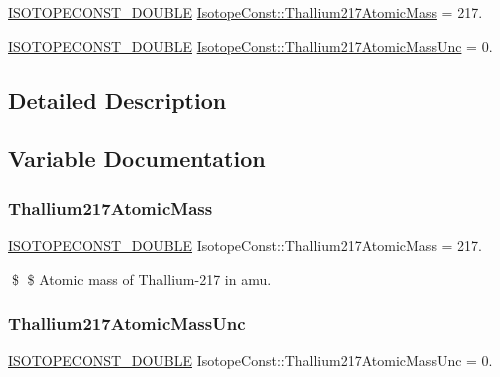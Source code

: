 \begin{DoxyCompactItemize}
\item 
\mbox{\hyperlink{group___isotope_const-_macros_ga8f45a7272ce02c0b4c65c44636ed719a}{I\+S\+O\+T\+O\+P\+E\+C\+O\+N\+S\+T\+\_\+\+D\+O\+U\+B\+LE}} \mbox{\hyperlink{group___isotope_const-_thallium-_tl217_gac9683eec31274404f19257ac10b9d9f0}{Isotope\+Const\+::\+Thallium217\+Atomic\+Mass}} = 217.
\item 
\mbox{\hyperlink{group___isotope_const-_macros_ga8f45a7272ce02c0b4c65c44636ed719a}{I\+S\+O\+T\+O\+P\+E\+C\+O\+N\+S\+T\+\_\+\+D\+O\+U\+B\+LE}} \mbox{\hyperlink{group___isotope_const-_thallium-_tl217_ga0723b6ed9545bc072bffe7bbfb5ac328}{Isotope\+Const\+::\+Thallium217\+Atomic\+Mass\+Unc}} = 0.
\end{DoxyCompactItemize}


\subsection{Detailed Description}


\subsection{Variable Documentation}
\mbox{\label{group___isotope_const-_thallium-_tl217_gac9683eec31274404f19257ac10b9d9f0}} 
\subsubsection{\texorpdfstring{Thallium217\+Atomic\+Mass}{Thallium217AtomicMass}}
{\footnotesize\ttfamily \mbox{\hyperlink{group___isotope_const-_macros_ga8f45a7272ce02c0b4c65c44636ed719a}{I\+S\+O\+T\+O\+P\+E\+C\+O\+N\+S\+T\+\_\+\+D\+O\+U\+B\+LE}} Isotope\+Const\+::\+Thallium217\+Atomic\+Mass = 217.}

\$ \$ Atomic mass of Thallium-\/217 in amu. \mbox{\label{group___isotope_const-_thallium-_tl217_ga0723b6ed9545bc072bffe7bbfb5ac328}} 
\subsubsection{\texorpdfstring{Thallium217\+Atomic\+Mass\+Unc}{Thallium217AtomicMassUnc}}
{\footnotesize\ttfamily \mbox{\hyperlink{group___isotope_const-_macros_ga8f45a7272ce02c0b4c65c44636ed719a}{I\+S\+O\+T\+O\+P\+E\+C\+O\+N\+S\+T\+\_\+\+D\+O\+U\+B\+LE}} Isotope\+Const\+::\+Thallium217\+Atomic\+Mass\+Unc = 0.}

